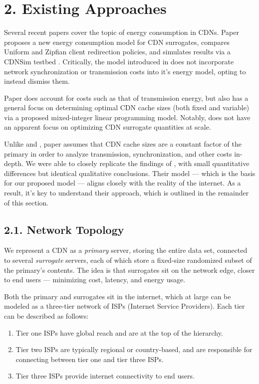 \documentclass[
	a4paper, %
	10pt, %
	unnumberedsections, %
	twoside, %
]{LTJournalArticle}
\begin{document}
\section{2. Existing Approaches}

Several recent papers cover the topic of energy consumption in CDNs. Paper \cite{ulIslam2012} proposes a new energy consumption model for CDN surrogates, compares Uniform and Zipfian client redirection policies, and simulates results via a CDNSim testbed \cite{cdnsim}. Critically, the model introduced in \cite{ulIslam2012} does not incorporate network synchronization or transmission costs into it's energy model, opting to instead dismiss them. 

Paper \cite{osmanthesis} does account for costs such as that of transmission energy, but also has a general focus on determining optimal CDN cache sizes (both fixed and variable) via a proposed mixed-integer linear programming model. Notably, \cite{osmanthesis} does not have an apparent focus on optimizing CDN surrogate quantities at scale.

Unlike \cite{osmanthesis} and \cite{ulIslam2012}, paper \cite{biancoCDNs2017} assumes that CDN cache sizes are a constant factor of the primary in order to analyze transmission, synchronization, and other costs in-depth. We were able to closely replicate the findings of \cite{biancoCDNs2017}, with small quantitative differences but identical qualitative conclusions. Their model — which is the basis for our proposed model — aligns closely with the reality of the internet. As a result, it's key to understand their approach, which is outlined in the remainder of this section.

\subsection{2.1. Network Topology}

We represent a CDN as a \textit{primary} server, storing the entire data set, connected to several \textit{surrogate} servers, each of which store a fixed-size randomized subset of the primary's contents. The idea is that surrogates sit on the network edge, closer to end users — minimizing cost, latency, and energy usage. 

Both the primary and surrogates sit in the internet, which at large can be modeled as a three-tier network of ISPs (Internet Service Providers). Each tier can be described as follows:
\begin{enumerate}
    \item Tier one ISPs have global reach and are at the top of the hierarchy.
    \item Tier two ISPs are typically regional or country-based, and are responsible for connecting between tier one and tier three ISPs.
    \item Tier three ISPs provide internet connectivity to end users.
\end{enumerate}
\end{document}
